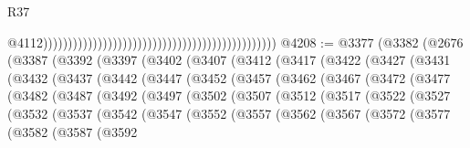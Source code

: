 \begin{lexlean}{R37}
\begin{coremodule}
                                                                                                  @4112)))))))))))))))))))))))))))))))))))))))))))))))
@4208 := @3377
    (@3382
      (@2676
        (@3387
          (@3392
            (@3397
              (@3402
                (@3407
                  (@3412
                    (@3417
                      (@3422
                        (@3427
                          (@3431
                            (@3432
                              (@3437
                                (@3442
                                  (@3447
                                    (@3452
                                      (@3457
                                        (@3462
                                          (@3467
                                            (@3472
                                              (@3477
                                                (@3482
                                                  (@3487
                                                    (@3492
                                                      (@3497
                                                        (@3502
                                                          (@3507
                                                            (@3512
                                                              (@3517
                                                                (@3522
                                                                  (@3527
                                                                    (@3532
                                                                      (@3537
                                                                        (@3542
                                                                          (@3547
                                                                            (@3552
                                                                              (@3557
                                                                                (@3562
                                                                                  (@3567
                                                                                    (@3572
                                                                                      (@3577
                                                                                        (@3582
                                                                                          (@3587
                                                                                            (@3592

\end{coremodule}
\end{lexlean}
